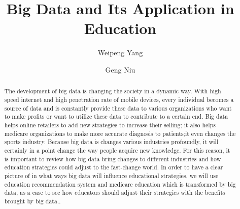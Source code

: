 \documentclass[sigconf]{acmart}
\begin{document}
\title{Big Data and Its Application in Education}

\author{Weipeng Yang}

\author{Geng Niu}



\begin{abstract}
The development of big data is changing the society in a dynamic way. With high speed internet and high penetration rate of mobile devices, every individual becomes a source of data and is constantly provide these data to various organizations who want to make profits or want to utilize these data to contribute to a certain end. Big data helps online retailers to add new strategies to increase their selling; it also helps medicare organizations to make more accurate diagnosis to patients;it even changes the sports industry. Because big data is changes various industries profoundly, it will certainly in a point change the way people acquire new knowledge. For this reason, it is important to review how big data bring changes to different industries and how education strategies could adjust to the fast-change world. In order to have a clear picture of in what ways big data will influence educational strategies, we will use education recommendation system and medicare education which is transformed by big data, as a case to see how educators should adjust their strategies with the benefits brought by big data..
\end{abstract}


\maketitle

\end{document}
